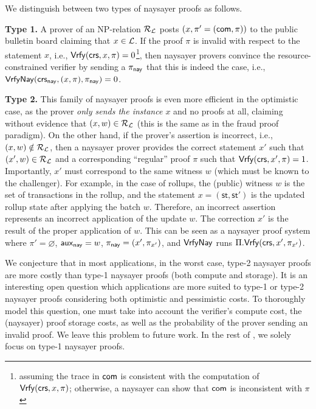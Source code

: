  We distinguish between two types of naysayer proofs as follows.
\begin{description}
    \item \textbf{Type 1.} A prover of an NP-relation $\mathcal{R}_{\mathcal{L}}$ posts $(x,\pi' = (\mathsf{com}, \pi))$ to the public bulletin board claiming that $x \in \mathcal{L}$. If the proof $\pi$ is invalid with respect to the statement $x$, i.e., $\mathsf{Vrfy}(\mathsf{crs}, x,\pi)=0$\footnote{assuming the trace in $\mathsf{com}$ is consistent with the computation of $\mathsf{Vrfy}(\mathsf{crs}, x, \pi)$; otherwise, a naysayer can show that $\mathsf{com}$ is inconsistent with $\pi$}, then naysayer provers convince the resource-constrained verifier by sending a $\pi_{\mathsf{nay}}$ that this is indeed the case, i.e., ${\mathsf{Vrfy}}\mathsf{Nay}(\mathsf{crs}_{\mathsf{nay}}, (x,\pi), \pi_{\mathsf{nay}})=0$. 
    \item \textbf{Type 2.} This family of naysayer proofs is even more efficient in the optimistic case, as the prover \emph{only sends the instance $x$} and no proofs at all, claiming without evidence that $(x,w) \in \mathcal{R}_{\mathcal{L}}$ (this is the same as in the fraud proof paradigm). On the other hand, if the prover's assertion is incorrect, i.e., $(x,w) \notin \mathcal{R}_{\mathcal{L}}$, then a naysayer prover provides the correct statement $x'$ such that $(x',w) \in \mathcal{R}_{\mathcal{L}}$ 
    and a corresponding ``regular'' proof $\pi$ such that $\mathsf{Vrfy}(\mathsf{crs}, x', \pi) = 1$. Importantly, $x'$ must correspond to the same witness $w$ (which must be known to the challenger). For example, in the case of rollups, the (public) witness $w$ is the set of transactions in the rollup, and the statement $x = (\mathsf{st}, \mathsf{st}')$ is the updated rollup state after applying the batch $w$. Therefore, an incorrect assertion represents an incorrect application of the update $w$. The correction $x'$ is the result of the proper application of $w$.
    This can be seen as a naysayer proof system where $\pi' = \varnothing$, $\mathsf{aux}_{\mathsf{nay}} = w$, $\pi_{\mathsf{nay}} = (x', \pi_{x'})$, and ${\mathsf{Vrfy}}\mathsf{Nay}$ runs $\Pi.\mathsf{Vrfy}(\mathsf{crs}, x', \pi_{x'})$.
\end{description}
We conjecture that in most applications, in the worst case, type-2 naysayer proofs are more costly than type-1 naysayer proofs (both compute and storage).
It is an interesting open question which applications are more suited to type-1 or type-2 naysayer proofs considering both optimistic and pessimistic costs. To thoroughly model this question, one must take into account the verifier's compute cost, the (naysayer) proof storage costs, as well as the probability of the prover sending an invalid proof. We leave this problem to future work.
In the rest of , we solely focus on type-1 naysayer proofs.